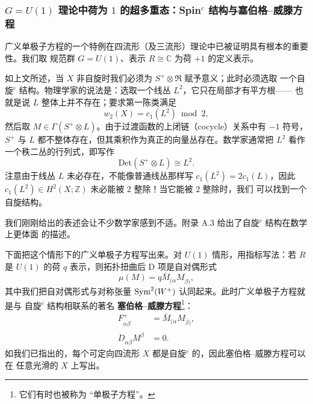 \subsubsection{$G=U(1)$ 理论中荷为 $1$ 的超多重态：Spin$^{c}$ 结构与塞伯格--威滕方程}
\label{sec:4-7-2}

广义单极子方程的一个特例在四流形（及三流形）理论中已被证明具有根本的重要性。我们取
规范群 $G=U(1)$、表示 $R\cong\mathbb{C}$ 为荷 $+1$ 的定义表示。

如上文所述，当 $X$ 非自旋时我们必须为 $S^{+}\otimes\mathfrak{R}$ 赋予意义；此时必须选取
一个自旋$^c$ 结构。物理学家的说法是：选取一个线丛 $L^{2}$，它只在局部才有平方根——
也就是说 $L$ 整体上并不存在；要求第一陈类满足
\begin{equation}
  w_{2}(X)=c_{1}(L^{2})\bmod 2,
  \tag{4.71}
\end{equation}
然后取 $M\in\Gamma(S^{+}\otimes L)$。由于过渡函数的上闭链（cocycle）关系中有 $-1$ 符号，
$S^{+}$ 与 $L$ 都不整体存在，但其乘积作为真正的向量丛存在。数学家通常把 $L^{2}$ 看作
一个秩二丛的行列式，即写作
\begin{equation}
  \mathrm{Det}(S^{+}\otimes L)\cong L^{2}.
  \tag{4.72}
\end{equation}
注意由于线丛 $L$ 未必存在，不能像普通线丛那样写 $c_{1}(L^{2})=2c_{1}(L)$，因此
$c_{1}(L^{2})\in H^{2}(X;\mathbb{Z})$ 未必能被 $2$ 整除！当它能被 $2$ 整除时，我们
可以找到一个自旋结构。


我们刚刚给出的表述会让不少数学家感到不适。附录 A.3 给出了自旋$^c$ 结构在数学上更体面
的描述。

下面把这个情形下的广义单极子方程写出来。对 $U(1)$ 情形，用指标写法：若 $R$ 是 $U(1)$
的荷 $q$ 表示，则拓扑扭曲后 D 项是自对偶形式
\begin{equation}
  \mu(M)=q\bar{M}_{(\dot\alpha}M_{\dot\beta)},
  \tag{4.73}
\end{equation}
其中我们把自对偶形式与对称张量 $\operatorname{Sym}^{2}(W^{+})$ 认同起来。此时广义单极子方程就是与
自旋$^c$ 结构相联系的著名 \textbf{塞伯格--威滕方程}\footnote{它们有时也被称为
“单极子方程”。}：
\begin{equation}
  \begin{aligned}
    F^{+}_{\dot\alpha\dot\beta}
      &=\bar{M}_{(\dot\alpha}M_{\dot\beta)},\\
    D_{\dot\alpha\dot\beta}M^{\dot\beta}&=0 .
  \end{aligned}
  \tag{4.74}
\end{equation}
如我们已指出的，每个可定向四流形 $X$ 都是自旋$^c$ 的，因此塞伯格--威滕方程可以在
任意光滑的 $X$ 上写出。

